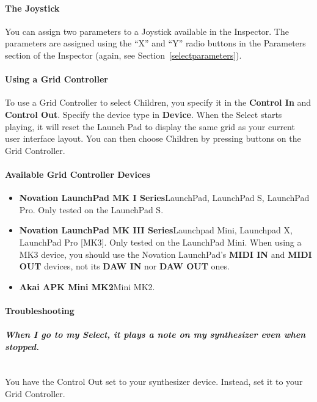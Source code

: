 \documentclass[twoside,10pt]{article}
\begin{document}
\paragraph{The Joystick}
You can assign two parameters to a Joystick available in the Inspector.  The parameters are assigned using the ``X'' and ``Y'' radio buttons in the Parameters section of the Inspector (again, see Section~\ref{selectparameters}).

\paragraph{Using a Grid Controller}

To use a Grid Controller to select Children, you specify it in the {\bf Control In} and {\bf Control Out}.  Specify the device type in {\bf Device}.  When the Select starts playing, it will reset the Launch Pad to display the same grid as your current user interface layout.  You can then choose Children by pressing buttons on the Grid Controller.

\paragraph{Available Grid Controller Devices}

\begin{itemize}
\item {\bf Novation LaunchPad MK I Series}\qquad LaunchPad, LaunchPad S, LaunchPad Pro.  Only tested on the LaunchPad S.   
\item {\bf Novation LaunchPad MK III Series}\qquad Launchpad Mini, Launchpad X, LaunchPad Pro [MK3].  Only tested on the LaunchPad Mini.  When using a MK3 device, you should use the Novation LaunchPad's {\bf MIDI IN} and {\bf MIDI OUT} devices, not its {\bf DAW IN} nor {\bf DAW OUT} ones.  
\item {\bf Akai APK Mini MK2}\qquad Mini MK2.   

\end{itemize}

\paragraph{Troubleshooting}

\paragraph{\it When I go to my Select, it plays a note on my synthesizer even when stopped.}~\\
\noindent You have the Control Out set to your synthesizer device.  Instead, set it to your Grid Controller.
\end{document}
